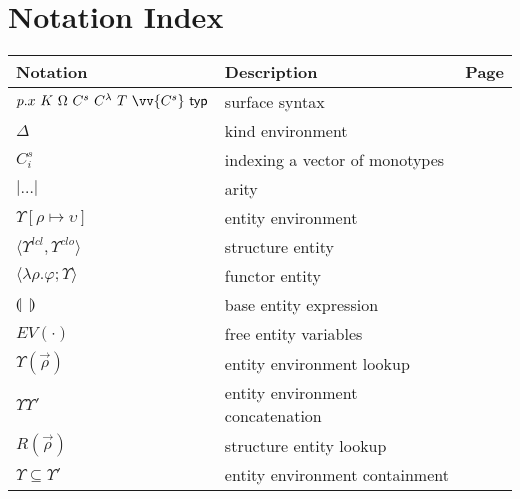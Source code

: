 \documentclass[tocchapterhead]{ccw_chithesis}
\begin{document}

\chapter{Notation Index}

\begin{tabular}{|l|l|l|}
\hline
Notation & Description & Page\\
\hline
$p.x~K~\Omega~C^s~C^\lambda~T~\vv{C^s}~\mathsf{typ}$ & surface syntax & \pageref{fig:semtypesystem}\\
\hline
$\Delta$ & kind environment & \pageref{fig:kindingsyntactic}\\
$C^s_i$ & indexing a vector of monotypes & \pageref{sec:typesystem-kindsystem}\\
$|\ldots|$ & arity & \pageref{sec:typesystem-notation}\\
\hline
$\Upsilon[\rho\mapsto \upsilon]$ & entity environment & \pageref{fig:entities}\\
$\langle\Upsilon^{lcl}, \Upsilon^{clo}\rangle$ & structure entity & \pageref{fig:entities}\\
$\langle\lambda\rho.\varphi; \Upsilon\rangle$ & functor entity & \pageref{fig:entities}\\
$\llparenthesis~~\rrparenthesis$ & base entity expression & \pageref{fig:entities}\\
$EV(\cdot)$ & free entity variables & \pageref{sec:entitycalc-notation}\\
$\Upsilon(\vec{\rho})$ & entity environment lookup & \pageref{sec:entitycalc-notation}\\
$\Upsilon\Upsilon'$ & entity environment concatenation & \pageref{sec:entitycalc-notation}\\
$R(\vec{\rho})$ & structure entity lookup & \pageref{sec:entitycalc-notation}\\
$\Upsilon \subseteq \Upsilon'$ & entity environment containment & \pageref{sec:entitycalc-notation}\\

\hline
\end{tabular}


\end{document}
